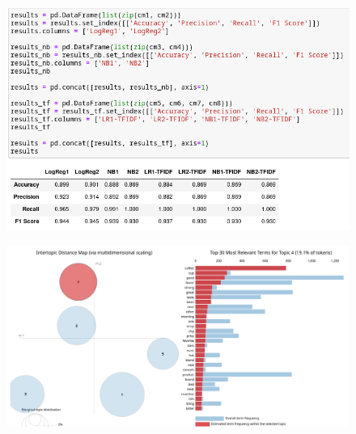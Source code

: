 \documentclass{beamer}
\begin{document}
\begin{frame}
    \begin{figure}
        \includegraphics[width=\textwidth]{../figures/result_all.png}
    \end{figure}
\end{frame}

\begin{frame}
    \begin{figure}
        \includegraphics[width=\textwidth]{../figures/result_coffe.png}
    \end{figure}
\end{frame}
\end{document}
